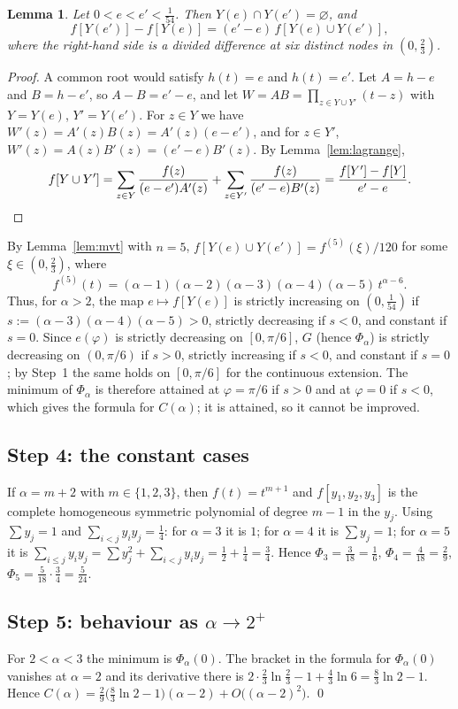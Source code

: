 \documentclass[11pt]{amsart}
\newtheorem{lemma}[theorem]{Lemma}
\theoremstyle{remark}
\begin{document}
\begin{lemma}\label{lem:six}
Let $0<e<e'<\frac1{54}$. Then $Y(e)\cap Y(e')=\varnothing$, and
\[
f[Y(e')]-f[Y(e)]=(e'-e)\,f[Y(e)\cup Y(e')],
\]
where the right-hand side is a divided difference at six distinct nodes in
$(0,\frac23)$.
\end{lemma}

\begin{proof}
A common root would satisfy $h(t)=e$ and $h(t)=e'$. Let $A=h-e$ and $B=h-e'$, so
$A-B=e'-e$, and let $W=AB=\prod_{z\in Y\cup Y'}(t-z)$ with $Y=Y(e)$, $Y'=Y(e')$. For
$z\in Y$ we have $W'(z)=A'(z)B(z)=A'(z)(e-e')$, and for $z\in Y'$,
$W'(z)=A(z)B'(z)=(e'-e)B'(z)$. By Lemma~\ref{lem:lagrange},
\[
f[Y\cup Y']=\sum_{z\in Y}\frac{f(z)}{(e-e')A'(z)}+\sum_{z\in Y'}\frac{f(z)}{(e'-e)B'(z)}
=\frac{f[Y']-f[Y]}{e'-e}. \qedhere
\]
\end{proof}

By Lemma~\ref{lem:mvt} with $n=5$, $f[Y(e)\cup Y(e')]=f^{(5)}(\xi)/120$ for some
$\xi\in(0,\frac23)$, where
\[
f^{(5)}(t)=(\alpha-1)(\alpha-2)(\alpha-3)(\alpha-4)(\alpha-5)\,t^{\alpha-6}.
\]
Thus, for $\alpha>2$, the map $e\mapsto f[Y(e)]$ is strictly increasing on
$(0,\frac1{54})$ if $s:=(\alpha-3)(\alpha-4)(\alpha-5)>0$, strictly decreasing if $s<0$,
and constant if $s=0$. Since $e(\varphi)$ is strictly decreasing on $[0,\pi/6]$, $G$
(hence $\Phi_\alpha$) is strictly decreasing on $(0,\pi/6)$ if $s>0$, strictly
increasing if $s<0$, and constant if $s=0$; by Step~1 the same holds on $[0,\pi/6]$ for
the continuous extension. The minimum of $\Phi_\alpha$ is therefore attained at
$\varphi=\pi/6$ if $s>0$ and at $\varphi=0$ if $s<0$, which gives the formula for $C(\alpha)$;
it is attained, so it cannot be improved.

\subsection*{Step 4: the constant cases}
If $\alpha=m+2$ with $m\in\{1,2,3\}$, then $f(t)=t^{m+1}$ and $f[y_1,y_2,y_3]$ is the
complete homogeneous symmetric polynomial of degree $m-1$ in the $y_j$. Using
$\sum y_j=1$ and $\sum_{i<j}y_iy_j=\frac14$: for $\alpha=3$ it is $1$; for $\alpha=4$ it is
$\sum y_j=1$; for $\alpha=5$ it is $\sum_{i\le j}y_iy_j=\sum y_j^2+\sum_{i<j}y_iy_j
=\frac12+\frac14=\frac34$. Hence $\Phi_3=\frac{3}{18}=\frac16$,
$\Phi_4=\frac4{18}=\frac29$, $\Phi_5=\frac5{18}\cdot\frac34=\frac5{24}$.

\subsection*{\texorpdfstring{Step 5: behaviour as $\alpha\to2^+$}{Step 5: behaviour near alpha = 2}}
For $2<\alpha<3$ the minimum is $\Phi_\alpha(0)$. The bracket in the formula for
$\Phi_\alpha(0)$ vanishes at $\alpha=2$ and its derivative there is
$2\cdot\frac23\ln\frac23-1+\frac43\ln6=\frac83\ln2-1$. Hence
$C(\alpha)=\frac{2}{9}\bigl(\frac83\ln2-1\bigr)(\alpha-2)+O\bigl((\alpha-2)^2\bigr)$. \qed
\end{document}
